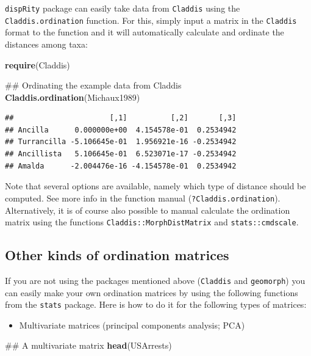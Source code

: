 \documentclass[]{book}
\newenvironment{Shaded}{\begin{snugshade}}{\end{snugshade}}
\newcommand{\KeywordTok}[1]{\textcolor[rgb]{0.13,0.29,0.53}{\textbf{#1}}}
\newcommand{\NormalTok}[1]{#1}
\providecommand{\tightlist}{%
  \setlength{\itemsep}{0pt}\setlength{\parskip}{0pt}}
\theoremstyle{definition}
\theoremstyle{definition}
\theoremstyle{remark}
\begin{document}
\texttt{dispRity} package can easily take data from \texttt{Claddis}
using the \texttt{Claddis.ordination} function. For this, simply input a
matrix in the \texttt{Claddis} format to the function and it will
automatically calculate and ordinate the distances among taxa:

\begin{Shaded}
\begin{Highlighting}[]
\KeywordTok{require}\NormalTok{(Claddis)}

\NormalTok{## Ordinating the example data from Claddis}
\KeywordTok{Claddis.ordination}\NormalTok{(Michaux1989) }
\end{Highlighting}
\end{Shaded}

\begin{verbatim}
##                      [,1]          [,2]       [,3]
## Ancilla      0.000000e+00  4.154578e-01  0.2534942
## Turrancilla -5.106645e-01  1.956921e-16 -0.2534942
## Ancillista   5.106645e-01  6.523071e-17 -0.2534942
## Amalda      -2.004476e-16 -4.154578e-01  0.2534942
\end{verbatim}

Note that several options are available, namely which type of distance
should be computed. See more info in the function manual
(\texttt{?Claddis.ordination}). Alternatively, it is of course also
possible to manual calculate the ordination matrix using the functions
\texttt{Claddis::MorphDistMatrix} and \texttt{stats::cmdscale}.

\subsection{Other kinds of ordination
matrices}\label{other-kinds-of-ordination-matrices}

If you are not using the packages mentioned above (\texttt{Claddis} and
\texttt{geomorph}) you can easily make your own ordination matrices by
using the following functions from the \texttt{stats} package. Here is
how to do it for the following types of matrices:

\begin{itemize}
\tightlist
\item
  Multivariate matrices (principal components analysis; PCA)
\end{itemize}

\begin{Shaded}
\begin{Highlighting}[]
\NormalTok{## A multivariate matrix}
\KeywordTok{head}\NormalTok{(USArrests)}
\end{Highlighting}
\end{Shaded}
\end{document}
